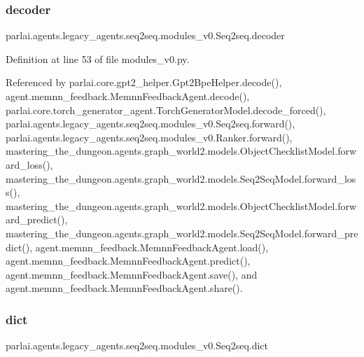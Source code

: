 \subsubsection{\texorpdfstring{decoder}{decoder}}
{\footnotesize\ttfamily parlai.\+agents.\+legacy\+\_\+agents.\+seq2seq.\+modules\+\_\+v0.\+Seq2seq.\+decoder}



Definition at line 53 of file modules\+\_\+v0.\+py.



Referenced by parlai.\+core.\+gpt2\+\_\+helper.\+Gpt2\+Bpe\+Helper.\+decode(), agent.\+memnn\+\_\+feedback.\+Memnn\+Feedback\+Agent.\+decode(), parlai.\+core.\+torch\+\_\+generator\+\_\+agent.\+Torch\+Generator\+Model.\+decode\+\_\+forced(), parlai.\+agents.\+legacy\+\_\+agents.\+seq2seq.\+modules\+\_\+v0.\+Seq2seq.\+forward(), parlai.\+agents.\+legacy\+\_\+agents.\+seq2seq.\+modules\+\_\+v0.\+Ranker.\+forward(), mastering\+\_\+the\+\_\+dungeon.\+agents.\+graph\+\_\+world2.\+models.\+Object\+Checklist\+Model.\+forward\+\_\+loss(), mastering\+\_\+the\+\_\+dungeon.\+agents.\+graph\+\_\+world2.\+models.\+Seq2\+Seq\+Model.\+forward\+\_\+loss(), mastering\+\_\+the\+\_\+dungeon.\+agents.\+graph\+\_\+world2.\+models.\+Object\+Checklist\+Model.\+forward\+\_\+predict(), mastering\+\_\+the\+\_\+dungeon.\+agents.\+graph\+\_\+world2.\+models.\+Seq2\+Seq\+Model.\+forward\+\_\+predict(), agent.\+memnn\+\_\+feedback.\+Memnn\+Feedback\+Agent.\+load(), agent.\+memnn\+\_\+feedback.\+Memnn\+Feedback\+Agent.\+predict(), agent.\+memnn\+\_\+feedback.\+Memnn\+Feedback\+Agent.\+save(), and agent.\+memnn\+\_\+feedback.\+Memnn\+Feedback\+Agent.\+share().

\mbox{\label{classparlai_1_1agents_1_1legacy__agents_1_1seq2seq_1_1modules__v0_1_1Seq2seq_aa80d0e73c519394baebfc597087017a5}} 
\subsubsection{\texorpdfstring{dict}{dict}}
{\footnotesize\ttfamily parlai.\+agents.\+legacy\+\_\+agents.\+seq2seq.\+modules\+\_\+v0.\+Seq2seq.\+dict}




